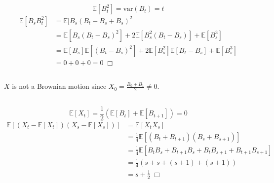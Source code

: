 \documentclass{article}
\begin{document}
\subsection{}
$$\mathbb{E}[B_t^2] = \mathrm{var}(B_t) = t$$
\begin{equation*}
\begin{split}
\mathbb{E}[B_sB_t^2] &= \mathbb{E}[B_s(B_t - B_s + B_s)^2\\
&= \mathbb{E}[B_s(B_t - B_s)^2] + 2\mathbb{E}[B_s^2(B_t - B_s)] + \mathbb{E}[B_s^3]\\
&= \mathbb{E}[B_s]\mathbb{E}[(B_t - B_s)^2] + 2\mathbb{E}[B_s^2]\mathbb{E}[B_t - B_s] + \mathbb{E}[B_s^3]\\
&= 0 + 0 + 0 = 0 \; \Box
\end{split}
\end{equation*}

\subsection{}
$X$ is not a Brownian motion since $X_0 = \frac{B_0 + B_1}{2} \neq 0$.

\subsection{}
$$\mathbb{E}[X_t] = \frac{1}{2}(\mathbb{E}[B_t] + \mathbb{E}[B_{t+1}]) = 0$$
\begin{equation*}
\begin{split}
\mathbb{E}\left[ (X_t - \mathbb{E}[X_t])(X_s - \mathbb{E}[X_s]) \right] &= \mathbb{E}[X_tX_s]\\
&= \frac{1}{4}\mathbb{E}[(B_t + B_{t+1})(B_s + B_{s+1})]\\
&= \frac{1}{4}\mathbb{E}[B_tB_s + B_{t+1}{B_s} + B_tB_{s+1} + B_{t+1}B_{s+1}]\\
&= \frac{1}{4}(s + s + (s + 1) + (s + 1))\\
&= s + \frac{1}{2} \; \Box
\end{split}
\end{equation*}
\end{document}
